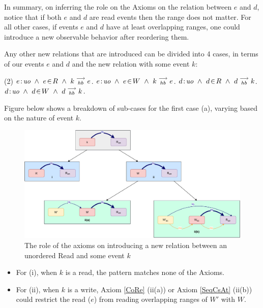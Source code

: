     In summary, on inferring the role on the Axioms on the relation between $e$ and $d$, notice that if both $e$ and $d$ are read events then the range does not matter. For all other cases, if events $e$ and $d$ have at least overlapping ranges, one could introduce a new observable behavior after reordering them.
    
    Any other new relations that are introduced can be divided into 4 cases, in terms of our events $e$ and $d$ and the new relation with some event $k$:
    \begin{tasks}(2)
        \task  $\et{e}{uo} \ \wedge \ \event{e}{R} \ \wedge \ \reln{k}{hb}{e}$.
        \task  $e\!:\!\textit{uo} \ \wedge \ e\!\in\!W \ \wedge \ k\stackrel{\longrightarrow}{_{hb}}e$.
        \task  $\et{d}{uo} \ \wedge \ \event{d}{R} \ \wedge \ \reln{d}{hb}{k}$.
        \task  $d\!:\!\textit{uo} \ \wedge \ d\!\in\!W \ \wedge \ d\stackrel{\longrightarrow}{_{hb}}k$.
    \end{tasks}
    
    Figure below shows a breakdown of sub-cases for the first case (a), varying based
    on the nature of event $k$.
    \begin{figure}[H]
        \centering
        \includegraphics[scale=0.6]{5.InstructionReordering/4.ValidReorderingCandidate/ProofParts/Part4/part4(a).pdf}
        \caption{The role of the axioms on introducing a new relation between an unordered Read and some event $k$}
        \label{fig:my_label}
    \end{figure}
    
    \begin{itemize}
        
        \item For (i), when $k$ is a read, the pattern matches none of the Axioms.
        \item For (ii), when $k$ is a write, Axiom \ref{CoRe} (ii(a)) or Axiom \ref{SeqCsAt} (ii(b)) could restrict the read ($e$) from reading overlapping ranges of $W'$ with $W$.
    \end{itemize}
    
